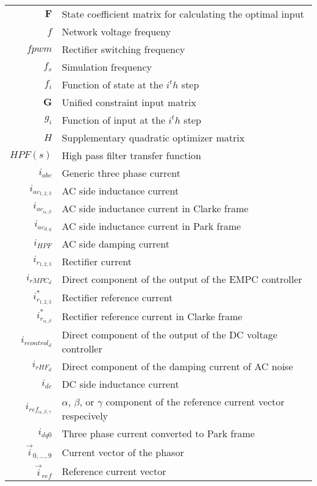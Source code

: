 \begin{scriptsize}
\begin{tabularx}{\textwidth}{r|X}
  $\textbf{F}$                & State coefficient matrix for calculating the optimal input \\
  $f$                               & Network voltage frequeny\\
  $fpwm$                            & Rectifier switching frequency\\
  $f_s$                             & Simulation frequency\\
  $f_i$                             & Function of state at the $i^th$ step\\
  
  $\textbf{G}$                & Unified constraint input matrix \\
  $g_i$                             & Function of input at the $i^th$ step\\
  
  $H$                               & Supplementary quadratic optimizer matrix\\
  $HPF(s)$                          & High pass filter transfer function\\
  
  $i_{abc}$                         & Generic three phase current\\
  $i_{ac_{1,2,3}}$                  & AC side inductance current\\
  $i_{ac_{\alpha,\beta}}$           & AC side inductance current in Clarke frame\\
  $i_{ac_{d,q}}$                    & AC side inductance current in Park frame\\
  $i_{HPF}$                         & AC side damping current\\
  $i_{r_{1,2,3}}$                   & Rectifier current\\
  $i_{rMPC_d}$                      & Direct component of the output of the EMPC controller\\
  $i^*_{r_{1,2,3}}$                 & Rectifier reference current\\
  $i^*_{r_{\alpha,\beta}}$          & Rectifier reference current in Clarke frame\\
  $i_{rcontrol_d}$                  & Direct component of the output of the DC voltage controller\\
  $i_{rHF_d}$                       & Direct component of the damping current of AC noise\\
  $i_{dc}$                          & DC side inductance current\\
  $i_{ref_{\alpha,\beta,\gamma}}$   & $\alpha$, $\beta$, or $\gamma$ component of the reference current vector respecively\\
  $i_{dq0}$                         & Three phase current converted to Park frame\\
  $\vec{i}_{0,\dots,9}$             & Current vector of the phasor\\
  $\vec{i}_{ref}$                   & Reference current vector\\
  

\end{tabularx}
\end{scriptsize}
